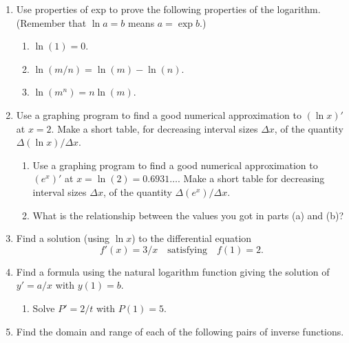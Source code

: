 \begin{enumerate}
\begin{enumerate}
  \item At what interest rate do \$5,000 now and
      \$8,000 in ten years have the same present value?


\end{enumerate}
\item Use properties of exp to prove the following properties of the logarithm.
  (Remember that $\ln{a} = b$  means $a = \exp{b}$.)


  \begin{enumerate}
  \item $\ln(1)=0$.

  \item $\ln(m/n) = \ln(m) - \ln(n)$.

  \item $\ln(m^n) = n \ln(m)$.


\end{enumerate}
\item Use a graphing program to find a good numerical approximation to
$(\ln{x})'$ at $x=2$.  Make a short table, for decreasing interval
sizes $\Delta x$, of the quantity $\Delta (\ln{x})/\Delta x$.

  \begin{enumerate}
  \item Use a graphing program to find a good numerical approximation to
$(e^x)'$ at $x=\ln(2)=0.6931\ldots$.  Make a short table for
decreasing interval sizes $\Delta x$, of the quantity $\Delta
(e^x)/\Delta x$.

  \item What is the relationship between the values you got in parts (a)
and (b)?


\end{enumerate}
\item Find a solution (using $\ln{x}$) to the differential equation
	\[
f'(x) = 3/x \quad \mbox{satisfying} \quad f(1)=2.
\]



\item Find a formula using the natural logarithm function giving the
solution of $y'= a/x$ with $y(1)=b$.

  \begin{enumerate}
  \item Solve $P' = 2/t$ with $P(1)=5$.



\end{enumerate}
\item Find the domain and range of each of the following pairs of
inverse functions.


\end{enumerate}
